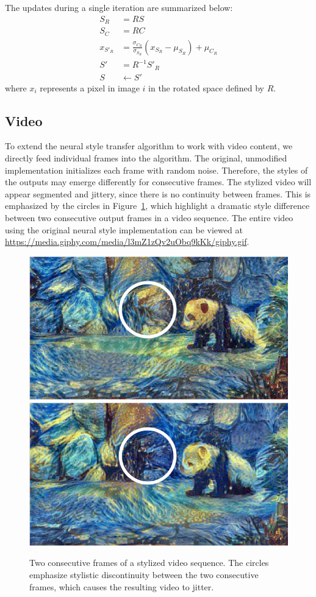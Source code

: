 \documentclass[10pt,twocolumn,letterpaper]{article}
\begin{document}
The updates during a single iteration are summarized below:
\begin{align}
  S_R &= R S \\
  S_C &= R C \\
  x_{S'_R} &= \frac{\sigma_{C_R}}{\sigma_{S_R}} (x_{S_R} - \mu_{S_R}) + \mu_{C_R} \\
  S' &= R^{-1} S'_R \\
  S &\leftarrow S'
\end{align}
where $x_i$ represents a pixel in image $i$ in the rotated space defined by $R$.

\subsection{Video}
To extend the neural style transfer algorithm to work with video content, we directly feed individual frames into the algorithm. The original, unmodified implementation initializes each frame with random noise. Therefore, the styles of the outputs may emerge differently for consecutive frames. The stylized video will appear segmented and jittery, since there is no continuity between frames. This is emphasized by the circles in Figure~\ref{fig:video-orig}, which highlight a dramatic style difference between two consecutive output frames in a video sequence. The entire video using the original neural style implementation can be viewed at \url{https://media.giphy.com/media/l3mZ1zQv2uObq9kKk/giphy.gif}.

\begin{figure}[ht]
\centering
\includegraphics[width=0.48\linewidth]{imgs/panda1.png}
\quad
\includegraphics[width=0.48\linewidth]{imgs/panda2.png}
\caption{Two consecutive frames of a stylized video sequence. The circles emphasize stylistic discontinuity between the two consecutive frames, which causes the resulting video to jitter.}
\label{fig:video-orig}
\end{figure}
\end{document}

